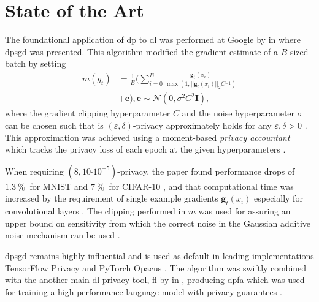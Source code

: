 \documentclass[12pt,fleqn,twocolumn]{article}
\newcommand{\pro}{\ensuremath{\:\%{}\:}}
\newcommand{\ctp}[1]{\ensuremath{\cdot10^{#1}}}
\newcommand{\reci}{\ensuremath{^{-1}}}
\begin{document}
\section*{State of the Art}%
\label{sec:State of The Art}
The foundational application of \acrshort{dp} to \acrshort{dl} was performed at Google by \textcite{abadi2016dldp} in \citeyear{abadi2016dldp} where \acrfull{dpsgd} was presented.
This algorithm modified the gradient estimate of a $B$-sized batch by setting
\begin{align*}
    m(g_t) &= \frac 1 B \Big(
        \sum_{i=0}^B \frac{\mathbf g_t(x_i)}{\operatorname{max}\left(1, || \mathbf g_t(x_i)||_2 C\reci\right)}
    \\ &+ \mathbf e \Big), \mathbf e\sim \mathcal N(0, \sigma^2C^2 \mathbf I),
\end{align*}
where the gradient clipping hyperparameter $C$ and the noise hyperparameter $\sigma$ can be chosen such that is $(\varepsilon, \delta)$-privacy approximately holds for any $\varepsilon, \delta > 0$ \cite[Ch. 3.1]{abadi2016dldp}.
This approximation was achieved using a moment-based \emph{privacy accountant} which tracks the privacy loss of each epoch at the given hyperparameters \cite[Ch. 3.2]{abadi2016dldp}.

When requiring $(8, 10\ctp{-5})$-privacy, the paper found performance drops of $1.3\pro$ for MNIST and $7\pro$ for CIFAR-10 \cite[Chap. 5.3]{abadi2016dldp}, and that computational time was increased by the requirement of single example gradients $\mathbf g_t(x_i)$ especially for convolutional layers \cite[Chap. 4]{abadi2016dldp}.
The clipping performed in $m$ was used for assuring an upper bound on sensitivity from which the correct noise in the Gaussian additive noise mechanism can be used \cite[Chap. 4]{abadi2016dldp}.

\acrshort{dpsgd} remains highly influential and is used as default in leading implementations TensorFlow Privacy \cite{rade2019tensorflow} and PyTorch Opacus \cite{yousef2021opacus}.
The algorithm was swiftly combined with the another main \acrshort{dl} privacy tool, \acrfull{fl} by \textcite{mcmahan2017learningdp} in \citeyear{mcmahan2017learningdp}, producing \acrfull{dpfa} which was used for training a high-performance language model with privacy guarantees \cite[Chap. 3]{mcmahan2017learningdp}.
\end{document}
